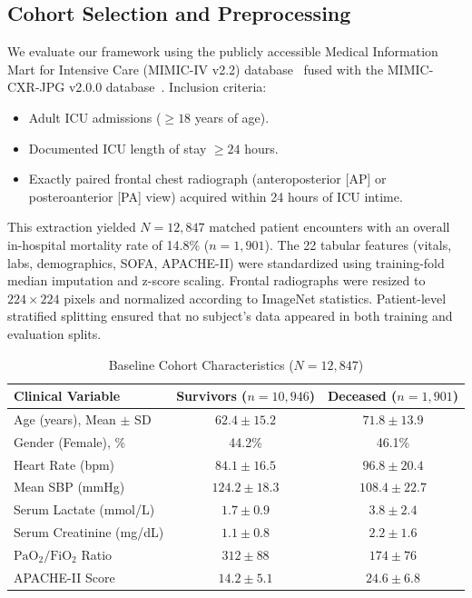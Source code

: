 \documentclass[10pt,journal,compsoc,twocolumn]{IEEEtran}
\begin{document}
\subsection{Cohort Selection and Preprocessing}
We evaluate our framework using the publicly accessible Medical Information Mart for Intensive Care (MIMIC-IV v2.2) database~\cite{johnson2023mimiciv} fused with the MIMIC-CXR-JPG v2.0.0 database~\cite{johnson2019mimiccxr}. Inclusion criteria:
\begin{itemize}
    \item Adult ICU admissions ($\ge 18$ years of age).
    \item Documented ICU length of stay $\ge 24$ hours.
    \item Exactly paired frontal chest radiograph (anteroposterior [AP] or posteroanterior [PA] view) acquired within 24 hours of ICU intime.
\end{itemize}
This extraction yielded $N = 12,847$ matched patient encounters with an overall in-hospital mortality rate of 14.8\% ($n = 1,901$). The 22 tabular features (vitals, labs, demographics, SOFA, APACHE-II) were standardized using training-fold median imputation and z-score scaling. Frontal radiographs were resized to $224 \times 224$ pixels and normalized according to ImageNet statistics. Patient-level stratified splitting ensured that no subject's data appeared in both training and evaluation splits.

\begin{table}[h]
\centering
\caption{Baseline Cohort Characteristics ($N=12,847$)}
\label{tab:cohort}
\begin{tabular}{lcc}
\toprule
\textbf{Clinical Variable} & \textbf{Survivors ($n=10,946$)} & \textbf{Deceased ($n=1,901$)} \\
\midrule
Age (years), Mean $\pm$ SD & $62.4 \pm 15.2$ & $71.8 \pm 13.9$ \\
Gender (Female), \% & 44.2\% & 46.1\% \\
Heart Rate (bpm) & $84.1 \pm 16.5$ & $96.8 \pm 20.4$ \\
Mean SBP (mmHg) & $124.2 \pm 18.3$ & $108.4 \pm 22.7$ \\
Serum Lactate (mmol/L) & $1.7 \pm 0.9$ & $3.8 \pm 2.4$ \\
Serum Creatinine (mg/dL) & $1.1 \pm 0.8$ & $2.2 \pm 1.6$ \\
$\text{PaO}_2 / \text{FiO}_2$ Ratio & $312 \pm 88$ & $174 \pm 76$ \\
APACHE-II Score & $14.2 \pm 5.1$ & $24.6 \pm 6.8$ \\
\bottomrule
\end{tabular}
\end{table}
\end{document}
